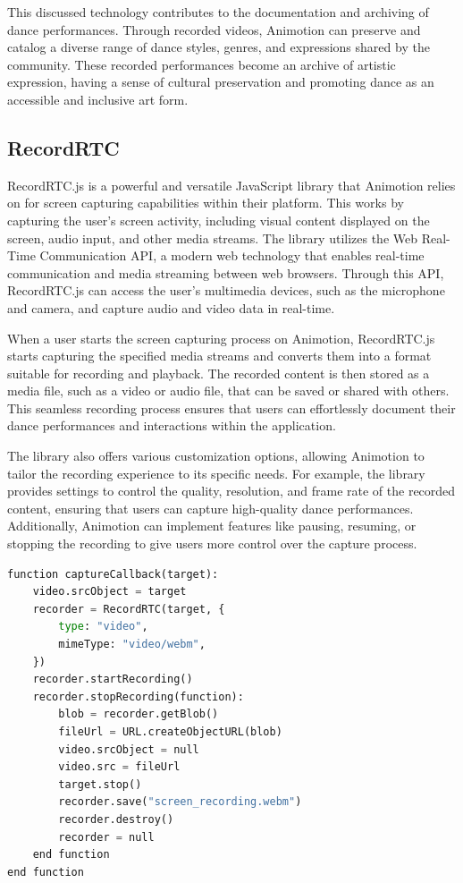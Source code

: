This discussed technology contributes to the documentation and archiving of dance performances. Through recorded videos, Animotion can preserve and 
catalog a diverse range of dance styles, genres, and expressions shared by the community. These recorded performances become an archive of artistic expression, 
having a sense of cultural preservation and promoting dance as an accessible and inclusive art form.

\subsection{RecordRTC}
RecordRTC.js is a powerful and versatile JavaScript library that Animotion relies on for screen capturing capabilities within their platform.
This works by capturing the user's screen activity, including visual content displayed on the screen, audio input, 
and other media streams. The library utilizes the Web Real-Time Communication API, a modern web technology that enables real-time 
communication and media streaming between web browsers. Through this API, RecordRTC.js can access the user's multimedia devices, 
such as the microphone and camera, and capture audio and video data in real-time. \cite{rtcrecord}

When a user starts the screen capturing process on Animotion, RecordRTC.js starts capturing the specified media 
streams and converts them into a format suitable for recording and playback. The recorded content is then stored as a media file, 
such as a video or audio file, that can be saved or shared with others. This seamless recording process ensures that users can 
effortlessly document their dance performances and interactions within the application.

The library also offers various customization options, allowing Animotion to tailor the recording experience to its specific needs. 
For example, the library provides settings to control the quality, resolution, and frame rate of the recorded content, ensuring that 
users can capture high-quality dance performances. Additionally, Animotion can implement features like pausing, resuming, or 
stopping the recording to give users more control over the capture process. \cite{rtcrecord2}

\begin{lstlisting}[language=Python,caption=Starting the screen capture process,label=lst:recordrtc]
  function captureCallback(target):
    video.srcObject = target
    recorder = RecordRTC(target, {
        type: "video",
        mimeType: "video/webm",
    })
    recorder.startRecording()
    recorder.stopRecording(function):
        blob = recorder.getBlob()
        fileUrl = URL.createObjectURL(blob)
        video.srcObject = null
        video.src = fileUrl
        target.stop()
        recorder.save("screen_recording.webm")
        recorder.destroy()
        recorder = null
    end function
end function
\end{lstlisting}

